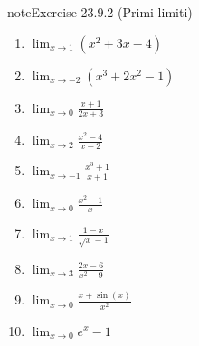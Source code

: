\documentclass[letterpaper,10pt,italian]{jupyterBook}
\begin{document}
\begin{sphinxadmonition}{note}{Exercise 23.9.2 (Primi limiti)}


\begin{enumerate}
%
\item {} 
\sphinxAtStartPar
\(\lim_{x \to 1} (x^2 + 3x - 4)\)

\item {} 
\sphinxAtStartPar
\(\lim_{x \to -2} (x^3 + 2x^2 - 1)\)

\item {} 
\sphinxAtStartPar
\(\lim_{x \to 0} \frac{x + 1}{2x + 3}\)

\item {} 
\sphinxAtStartPar
\(\lim_{x \to 2} \frac{x^2 - 4}{x - 2}\)

\item {} 
\sphinxAtStartPar
\(\lim_{x \to -1} \frac{x^3 + 1}{x + 1}\)

\item {} 
\sphinxAtStartPar
\(\lim_{x \to 0} \frac{x^2 - 1}{x}\)

\item {} 
\sphinxAtStartPar
\(\lim_{x \to 1} \frac{1 - x}{\sqrt{x} - 1}\)

\item {} 
\sphinxAtStartPar
\(\lim_{x \to 3} \frac{2x - 6}{x^2 - 9}\)

\item {} 
\sphinxAtStartPar
\(\lim_{x \to 0} \frac{x + \sin(x)}{x^2}\)

\item {} 
\sphinxAtStartPar
\(\lim_{x \to 0} e^x - 1\)

\end{enumerate}
\end{sphinxadmonition}
\end{document}
